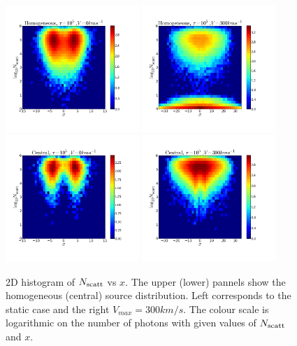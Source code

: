 \documentclass[usenatbib]{mn2e}
\begin{document}
\begin{figure}
     \includegraphics[width=0.45\textwidth]{2dHistogram0t5HOM.png}
     \includegraphics[width=0.45\textwidth]{2dHistogram300t5HOM.png} 
     \includegraphics[width=0.45\textwidth]{2dHistogram0t5.png}
     \includegraphics[width=0.45\textwidth]{2dHistogram300t5.png}    

    \caption{2D histogram of $N_{\rm scatt}$ vs $x$. The upper (lower) pannels
      show the homogeneous (central) source distribution. Left
      corresponds to the static case and the right
      $V_{max}=300km/s$. The colour scale is logarithmic on the
      number of photons with given values of $N_{\rm scatt}$ and
      $x$. \label{fig:Nscatt2D}}   
\end{figure}
\end{document}
